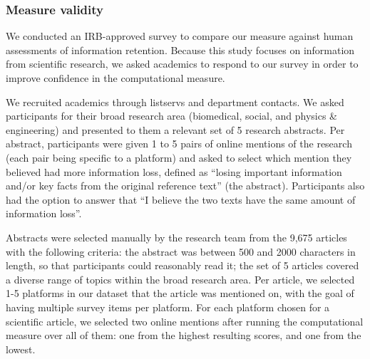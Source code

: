 \documentclass[letterpaper]{article} %
\begin{document}
\subsubsection{Measure validity}
We conducted an IRB-approved survey to compare our measure against human assessments of information retention. Because this study focuses on information from scientific research, we asked academics to respond to our survey in order to improve confidence in the computational measure.

We recruited academics through listservs and department contacts. We asked participants for their broad research area (biomedical, social, and physics \& engineering) and presented to them a relevant set of 5 research abstracts. Per abstract, participants were given 1 to 5 pairs of online mentions of the research (each pair being specific to a platform) and asked to select which mention they believed had more information loss, defined as ``losing important information and/or key facts from the original reference text'' (the abstract). Participants also had the option to answer that ``I believe the two texts have the same amount of information loss''.

Abstracts were selected manually by the research team from the 9,675 articles with the following criteria: the abstract was between 500 and 2000 characters in length, so that participants could reasonably read it; the set of 5 articles covered a diverse range of topics within the broad research area.
Per article, we selected 1-5 platforms in our dataset that the article was mentioned on, with the goal of having multiple survey items per platform. For each platform chosen for a scientific article, we selected two online mentions after running the computational measure over all of them: one from the highest resulting scores, and one from the lowest. %
\end{document}
